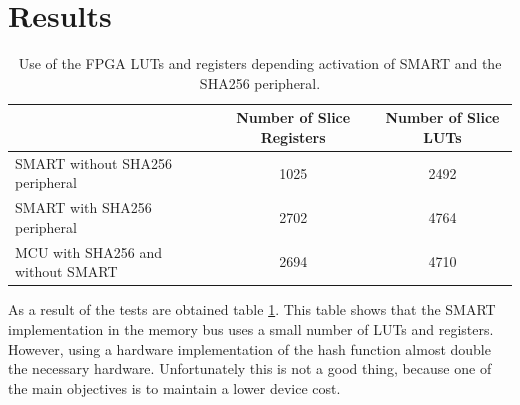 




\section{Results}

\begin{table}
	\begin{center}
		\begin{tabular}{|p{4cm}|c|c|}
			\hline 
			& \textbf{Number of Slice Registers} & \textbf{Number of Slice LUTs} \\
			\hline 
			SMART without SHA256 peripheral & 1025 & 2492 \\
			\hline 
			SMART with SHA256 peripheral & 2702 & 4764 \\
			\hline 
			MCU with SHA256 and without SMART & 2694 & 4710 \\
			\hline 
		\end{tabular}
	\end{center}
	\caption{Use of the FPGA LUTs and registers depending activation of SMART and the SHA256 peripheral.}
	\label{table:results}
\end{table}

As a result of the tests are obtained table \ref{table:results}. This table shows that the SMART implementation in the memory bus uses a small number of LUTs and registers. However, using a hardware implementation of the hash function almost double the necessary hardware. Unfortunately this is not a good thing, because one of the main objectives is to maintain a lower device cost.

